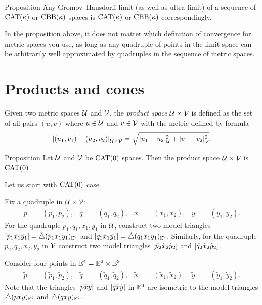 \begin{thm}{Proposition}\label{prop:cat-limit}
Any Gromov--Hausdorff limit (as well as ultra limit) of a sequence of $\mathrm{CAT}(\kappa)$ or $\mathrm{CBB}(\kappa)$ spaces is $\mathrm{CAT}(\kappa)$ or $\mathrm{CBB}(\kappa)$ correspondingly. 
\end{thm}

In the proposition above, 
it does not matter which definition of convergence for metric spaces you use, 
as long as any quadruple of points in the limit space can be arbitrarily well approximated by  quadruples in the sequence of metric spaces. 

\section{Products and cones}

Given two metric spaces $\mathcal{U}$ and $\mathcal{V}$, the \emph{product space} 
$\mathcal{U}\times\mathcal{V}$ is defined as the set of all pairs $(u,v)$ where $u\in\mathcal{U}$ and $v\in \mathcal{V}$ 
with the metric defined by formula
\[\dist{(u_1,v_1)}{(u_2,v_2)}{\spc{U}\times\spc{V}}=\sqrt{\dist[2]{u_1}{u_2}{\spc{U}}+\dist[2]{v_1}{v_2}{\spc{V}}}.\]

\begin{thm}{Proposition}\label{ex:product-CAT}
Let $\mathcal{U}$ and $\mathcal{V}$ be $\mathrm{CAT}(0)$ spaces.
Then the product space $\mathcal{U}\times\mathcal{V}$ is $\mathrm{CAT}(0)$.
\end{thm}

Let us start with $\mathrm{CAT}(0)$ case.

Fix a quadruple in $\mathcal{U}\times \mathcal{V}$:
\begin{align*}
p&=(p_1,p_2),
&
q&=(q_1,q_2), 
&
x&=(x_1,x_2),
&
y&=(y_1,y_2).
\end{align*}
For the quadruple $p_1,q_1,x_1,y_1$ in $\mathcal{U}$,
construct two model triangles $[\tilde p_1\tilde x_1\tilde y_1]=\tilde\triangle(p_1x_1y_1)_{\mathbb{E}^2}$ 
and $[\tilde q_1\tilde x_1\tilde y_1]=\tilde\triangle(q_1x_1y_1)_{\mathbb{E}^2}$.  
Similarly, for the quadruple $p_2,q_2,x_2,y_2$ in $\mathcal{V}$
construct two model triangles $[\tilde p_2\tilde x_2\tilde y_2]$ and $[\tilde q_2\tilde x_2\tilde y_2]$.

Consider four points in $\mathbb{E}^4=\mathbb{E}^2\times\mathbb{E}^2$ 
\begin{align*}
\tilde p&=(\tilde p_1,\tilde p_2),
&
\tilde q&=(\tilde q_1,\tilde q_2),
&
\tilde x&=(\tilde x_1,\tilde x_2),
&
\tilde y&=(\tilde y_1,\tilde y_2).
\end{align*}
Note that the triangles $[\tilde p\tilde x\tilde y]$ and $[\tilde q\tilde x\tilde y]$ in $\mathbb{E}^4$ are isometric to the model triangles 
$\tilde\triangle(pxy)_{\mathbb{E}^2}$ and $\tilde\triangle(qxy)_{\mathbb{E}^2}$.

